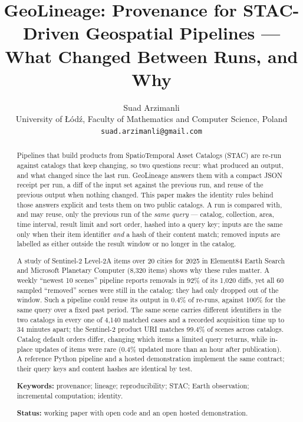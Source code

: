 \documentclass[11pt,a4paper]{article}
\title{GeoLineage: Provenance for STAC-Driven Geospatial Pipelines ---\\ What Changed Between Runs, and Why}
\author{Suad Arzimanli\\[2pt]
        \small University of \L{}ód\'{z}, Faculty of Mathematics and Computer Science, Poland\\
        \small \texttt{suad.arzimanli@gmail.com}}
\date{}
\begin{document}
\maketitle

\begin{abstract}
Pipelines that build products from SpatioTemporal Asset Catalogs (STAC) are re-run against catalogs that keep changing, so two questions recur: what produced an output, and what changed since the last run. GeoLineage answers them with a compact JSON receipt per run, a diff of the input set against the previous run, and reuse of the previous output when nothing changed. This paper makes the identity rules behind those answers explicit and tests them on two public catalogs. A run is compared with, and may reuse, only the previous run of the \emph{same query} --- catalog, collection, area, time interval, result limit and sort order, hashed into a query key; inputs are the same only when their item identifier \emph{and} a hash of their content match; removed inputs are labelled as either outside the result window or no longer in the catalog.

A study of Sentinel-2 Level-2A items over 20 cities for 2025 in Element84 Earth Search and Microsoft Planetary Computer (8{,}320 items) shows why these rules matter. A weekly ``newest 10 scenes'' pipeline reports removals in 92\% of its 1{,}020 diffs, yet all 60 sampled ``removed'' scenes were still in the catalog: they had only dropped out of the window. Such a pipeline could reuse its output in 0.4\% of re-runs, against 100\% for the same query over a fixed past period. The same scene carries different identifiers in the two catalogs in every one of 4{,}140 matched cases and a recorded acquisition time up to 34 minutes apart; the Sentinel-2 product URI matches 99.4\% of scenes across catalogs. Catalog default orders differ, changing which items a limited query returns, while in-place updates of items were rare (0.4\% updated more than an hour after publication). A reference Python pipeline and a hosted demonstration implement the same contract; their query keys and content hashes are identical by test.

\medskip
\noindent\textbf{Keywords:} provenance; lineage; reproducibility; STAC; Earth observation; incremental computation; identity.

\smallskip
\noindent\textbf{Status:} working paper with open code and an open hosted demonstration.
\end{abstract}

\end{document}
